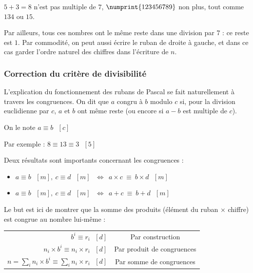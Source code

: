 \documentclass[a4paper]{article}
\begin{document}
$5 + 3 = 8$ n'est pas multiple de $7$, $\numprint{123456789}$ non plus, tout comme $134$ ou $15$.

\vspace{2mm}

Par ailleurs, tous ces nombres ont le même reste dans une division par $7$ : ce reste est $1$. 
Par commodité, on peut aussi écrire le ruban de droite à gauche, et dans ce cas garder l'ordre naturel des chiffres dans l'écriture de $n$.\\

\vfill



\subsubsection*{Correction du critère de divisibilité}\label{ruban_correction}

	L'explication du fonctionnement des rubans de Pascal se fait naturellement à travers les congruences. On dit que $a$ congru à $b$ modulo $c$ si, pour la division euclidienne par $c$, $a$ et $b$ ont même reste (ou encore si $a - b$ est multiple de $c$).
	
\vspace{2 mm}
	
	On le note $a ≡ b ~~~ [c]$
	
\vspace{2 mm}
	
	Par exemple : $8 ≡ 13 ≡ 3 ~~~ [5]$
	
\vspace{2 mm}
	 
	Deux résultats sont importants concernant les congruences :

\begin{itemize}
	\item[] $a ≡ b ~~~ [m], ~ c ≡ d ~~~ [m] ~~~ \Longleftrightarrow ~~ a × c ~ ≡ ~ b × d ~~~ [m]$
    \item[] $a ≡ b ~~~ [m], ~ c ≡ d ~~~ [m] ~~~ \Longleftrightarrow ~~ a + c ~ ≡ ~ b + d ~~~ [m]$
\end{itemize}	

\vspace{2 mm}

	Le but est ici de montrer que la somme des produits (élément du ruban × chiffre) est congrue au nombre lui-même : 
	
\begin{tabular}{rc}

$b^i ≡ r_i ~~~ [d]$ & Par construction\\
$n_i × b^i ≡ n_i × r_i ~~~ [d]$ & Par produit de congruences\\
$n = \sum\limits_i n_i × b^i ≡ \sum\limits_i n_i × r_i ~~~ [d]$ & Par somme de congruences\\

\end{tabular}
\end{document}
